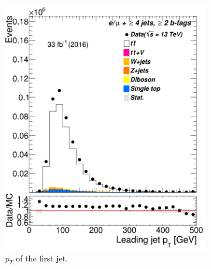 \begin{figure} [t]%
	\centering
	
	
	
	
	\begin{subfigure}{0.25\textwidth}
		\includegraphics[width=\linewidth]{ControlPlots_emujets_2016_4incl_2incl/jet0_pt_emujets_2016.png}
		\caption{$p_T$ of the first jet.} \label{fig:Sec21}
	\end{subfigure}\hspace*{0.5cm}
	\begin{subfigure}{0.25\textwidth}

\end{subfigure}
\end{figure}
